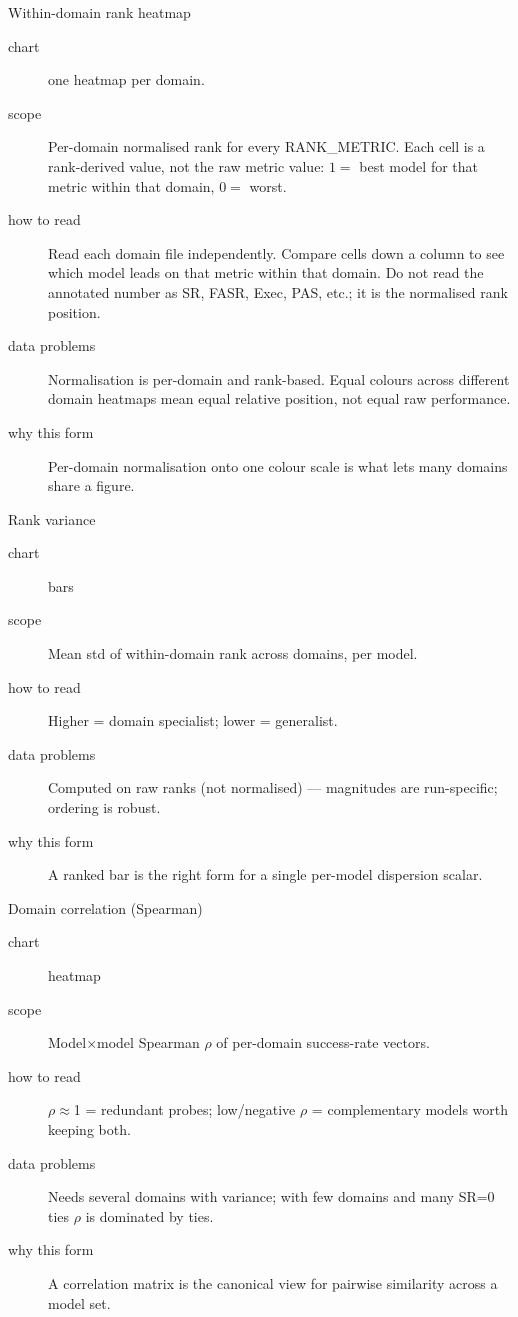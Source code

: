 \begin{bmplotcard}{Within-domain rank heatmap}
\begin{description}
\item[chart] one heatmap per domain.
\item[scope] Per-domain normalised rank for every RANK\_METRIC. Each cell is a rank-derived value, not the raw metric value: \(1=\) best model for that metric within that domain, \(0=\) worst.
\item[how to read] Read each domain file independently. Compare cells down a column to see which model leads on that metric within that domain. Do not read the annotated number as SR, FASR, Exec, PAS, etc.; it is the normalised rank position.
\item[data problems] Normalisation is per-domain and rank-based. Equal colours across different domain heatmaps mean equal relative position, not equal raw performance.
\item[why this form] Per-domain normalisation onto one colour scale is what lets many domains share a figure.
\end{description}
\end{bmplotcard}

\begin{bmplotcard}{Rank variance}
\begin{description}
\item[chart] bars
\item[scope] Mean std of within-domain rank across domains, per model.
\item[how to read] Higher = domain specialist; lower = generalist.
\item[data problems] Computed on raw ranks (not normalised) --- magnitudes are run-specific; ordering is robust.
\item[why this form] A ranked bar is the right form for a single per-model dispersion scalar.
\end{description}
\end{bmplotcard}

\begin{bmplotcard}{Domain correlation (Spearman)}
\begin{description}
\item[chart] heatmap
\item[scope] Model\(\times\)model Spearman \(\rho\) of per-domain success-rate vectors.
\item[how to read] \(\rho\)\(\approx\)1 = redundant probes; low/negative \(\rho\) = complementary models worth keeping both.
\item[data problems] Needs several domains with variance; with few domains and many SR=0 ties \(\rho\) is dominated by ties.
\item[why this form] A correlation matrix is the canonical view for pairwise similarity across a model set.
\end{description}
\end{bmplotcard}

